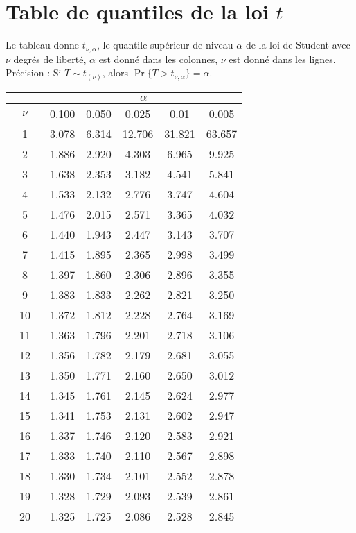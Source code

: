 \section{Table de quantiles de la loi $t$}
\label{chap:t}

Le tableau donne $t_{\nu,\alpha}$, le quantile sup\'erieur de niveau $\alpha$ de la loi de Student avec $\nu$ degr\'es de libert\'e, $\alpha$ est donn\'e dans les colonnes, $\nu$ est donn\'e dans les lignes. Pr\'ecision : Si $T\sim t_{(\nu)}$, alors $\Pr \{T > t_{\nu,\alpha}\} =\alpha$.

\begin{center}
\setlength{\tabcolsep}{10pt}
\begin{tabular}{|c|ccccc|}
\hline
&\multicolumn{5}{|c|}{$\alpha$}\\
\hline
$\quad \nu \quad $&0.100&0.050&0.025&0.01&0.005\\
\hline
 1&  3.078&  6.314& 12.706& 31.821& 63.657\\
 2&  1.886&  2.920&  4.303&  6.965&  9.925\\
 3&  1.638&  2.353&  3.182&  4.541&  5.841\\
 4&  1.533&  2.132&  2.776&  3.747&  4.604\\
 5&  1.476&  2.015&  2.571&  3.365&  4.032\\
 6&  1.440&  1.943&  2.447&  3.143&  3.707\\
 7&  1.415&  1.895&  2.365&  2.998&  3.499\\
 8&  1.397&  1.860&  2.306&  2.896&  3.355\\
 9&  1.383&  1.833&  2.262&  2.821&  3.250\\
10&  1.372&  1.812&  2.228&  2.764&  3.169\\
11&  1.363&  1.796&  2.201&  2.718&  3.106\\
12&  1.356&  1.782&  2.179&  2.681&  3.055\\
13&  1.350&  1.771&  2.160&  2.650&  3.012\\
14&  1.345&  1.761&  2.145&  2.624&  2.977\\
15&  1.341&  1.753&  2.131&  2.602&  2.947\\
16&  1.337&  1.746&  2.120&  2.583&  2.921\\
17&  1.333&  1.740&  2.110&  2.567&  2.898\\
18&  1.330&  1.734&  2.101&  2.552&  2.878\\
19&  1.328&  1.729&  2.093&  2.539&  2.861\\
20&  1.325&  1.725&  2.086&  2.528&  2.845\\

\end{tabular}
\end{center}
